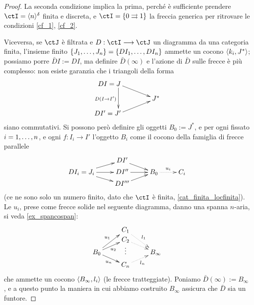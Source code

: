 \begin{proof}
	La seconda condizione implica la prima, perché è sufficiente prendere \(\ctI=\bkt{n}^\delta\) finita e discreta, e \(\ctI=\{0\rightrightarrows 1\}\) la freccia generica per ritrovare le condizioni \ref{cf_1}, \ref{cf_2}.

	Viceversa, se \(\ctJ\) è filtrata e \(D : \ctI \fun\ctJ\) un diagramma da una categoria finita, l'insieme finito \(\{\tup Jn,\}=\{DI_1,\dots, DI_n\}\) ammette un cocono \(\langle k_i,J^*\rangle\); possiamo porre \(\bar D I := DI\), ma definire \(\bar D (\infty)\) e l'azione di \(\bar D\) sulle frecce è più complesso: non esiste garanzia che i triangoli della forma
	\[\xymatrix@R=3mm{
		**[l] DI=J\ar[dr]\ar[dd]_{D(I\to I')} \\
		&J^* \\
		**[l] DI'=J'\ar[ur]
		}\]
	siano commutativi. Si possono però definire gli oggetti \(B_0 := J^*\), e per ogni fissato \(i=\iter n\), e ogni \(f : I_i \to I'\) l'oggetto \(B_i\) come il cocono della famiglia di frecce parallele
	\[\xymatrix@R=1mm{
		&DI'\ar[dr]&\\
		DI_i = J_i\ar[ur]\ar[r]\ar[dr]& DI''\ar[r]& B_0 \ar@{.>}[r]^-{u_i} & C_i\\
		&DI'''\ar[ur]&
		}\]
	(ce ne sono solo un numero finito, dato che \(\ctI\) è finita, \ref{cat_finita_locfinita}). Le \(u_i\), prese come frecce solide nel seguente diagramma, danno una spanna \(n\)-aria, si veda \ref{ex_spancospan}:
	\[\xymatrix@R=0mm{
		& C_1\ar@{.>}[ddr]^{l_1}\\
		& C_2\ar@{.>}[dr]\\
		B_0 \ar[uur]^-{u_1}\ar[ur]_{u_2}\ar[dr]_-{u_n} & \vdots & B_\infty\\
		& C_n\ar@{.>}[ur]_{l_n}
		}\]
	che ammette un cocono \(\langle B_\infty,l_i\rangle\) (le frecce tratteggiate). Poniamo \(\bar D(\infty) := B_\infty\), e a questo punto la maniera in cui abbiamo costruito \(B_\infty\) assicura che \(\bar D\) sia un funtore.
\end{proof}
